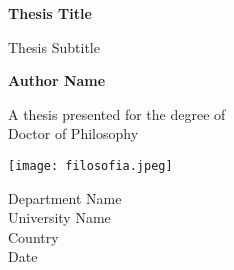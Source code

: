 \begin{titlepage}
    \begin{center}
        \vspace*{1cm}

        \Huge
        \textbf{Thesis Title}

        \vspace{0.5cm}
        \LARGE
        Thesis Subtitle

        \vspace{1.5cm}

        \textbf{Author Name}

        \vfill

        A thesis presented for the degree of\\
        Doctor of Philosophy

        \vspace{0.8cm}

        \texttt{[image: filosofia.jpeg]}

        \Large
        Department Name\\
        University Name\\
        Country\\
        Date

    \end{center}
\end{titlepage}
